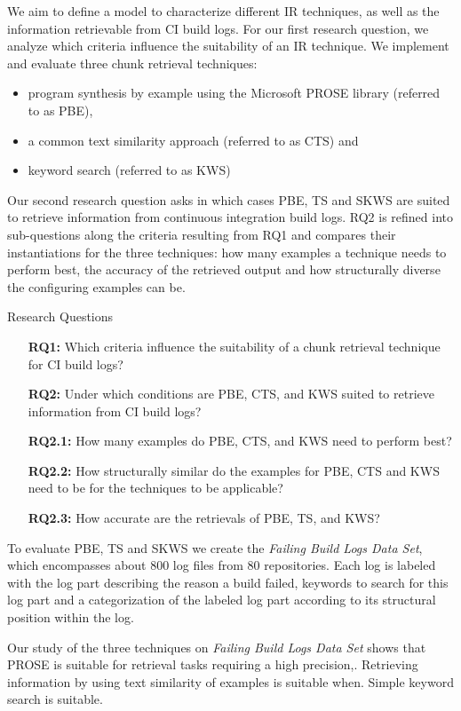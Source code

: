 \documentclass[\myrootdir/main.tex]{subfiles}
\begin{document}
We aim to define a model to characterize different IR techniques, as well as the information retrievable from CI build logs.
For our first research question, we analyze which criteria influence the suitability of an IR technique.
We implement and evaluate three chunk retrieval techniques:
\begin{itemize}
  \item program synthesis by example using the Microsoft PROSE library (referred to as PBE),
  \item a common text similarity approach (referred to as CTS) and
  \item keyword search (referred to as KWS)
\end{itemize}
Our second research question asks in which cases PBE, TS and SKWS are suited to retrieve information from continuous integration build logs. RQ2 is refined into sub-questions along the criteria resulting from RQ1 and compares their instantiations for the three techniques: how many examples a technique needs to perform best, the accuracy of the retrieved output and how structurally diverse the configuring examples can be.
\begin{simplebox}{Research Questions}
\begin{itemize}
  \item[\textbf{RQ1:}] Which criteria influence the suitability of a chunk retrieval technique for CI build logs?
  \item[\textbf{RQ2:}] Under which conditions are PBE, CTS, and KWS suited to retrieve information from CI build logs?
  \item[\textbf{RQ2.1:}] How many examples do PBE, CTS, and KWS need to perform best?
  \item[\textbf{RQ2.2:}] How structurally similar do the examples for PBE, CTS and KWS need to be for the techniques to be applicable?
  \item[\textbf{RQ2.3:}] How accurate are the retrievals of PBE, TS, and KWS?
\end{itemize}
\end{simplebox}
To evaluate PBE, TS and SKWS we create the \emph{Failing Build Logs Data Set}, which encompasses about 800 log files from 80 repositories. Each log is labeled with the log part describing the reason a build failed, keywords to search for this log part and a categorization of the labeled log part according to its structural position within the log. 



Our study of the three techniques on \emph{Failing Build Logs Data Set} shows that PROSE is suitable for retrieval tasks requiring a high precision,. Retrieving information by using text similarity of examples is suitable when. Simple keyword search is suitable.
\end{document}
